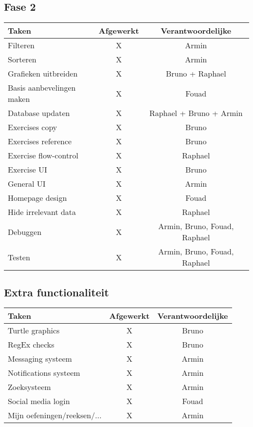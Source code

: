\subsection{Fase 2}
\begin{tabular}{| l | c | c |}
    \hline
    Taken   &   Afgewerkt   &   Verantwoordelijke \\
    \hline \hline
    Filteren                &   X   &   Armin   \\
    Sorteren                &   X   &   Armin   \\
    Grafieken uitbreiden    &   X   &   Bruno + Raphael \\
    Basis aanbevelingen maken &   X   & Fouad \\
    Database updaten        &   X   &   Raphael + Bruno + Armin \\
    Exercises copy          &   X   &   Bruno   \\
    Exercises reference     &   X   &   Bruno   \\
    Exercise flow-control   &   X   &   Raphael \\
    Exercise UI             &   X   &   Bruno   \\
    General UI              &   X   &   Armin   \\
    Homepage design         &   X   &   Fouad   \\
    Hide irrelevant data    &   X   &   Raphael \\
    \hline
    Debuggen                &   X   &   Armin, Bruno, Fouad, Raphael    \\
    Testen                  &   X   &   Armin, Bruno, Fouad, Raphael    \\
    \hline
\end{tabular}


\subsection{Extra functionaliteit}
\begin{tabular}{| l | c | c |}
    \hline
    Taken   &   Afgewerkt   &   Verantwoordelijke \\
    \hline \hline
    Turtle graphics         &   X   &   Bruno   \\
    RegEx checks            &   X   &   Bruno   \\
    Messaging systeem       &   X   &   Armin   \\
    Notifications systeem   &   X   &   Armin   \\
    Zoeksysteem             &   X   &   Armin   \\
    Social media login      &   X   &   Fouad   \\
    Mijn oefeningen/reeksen/...    &   X   &   Armin   \\
    \hline
\end{tabular}

